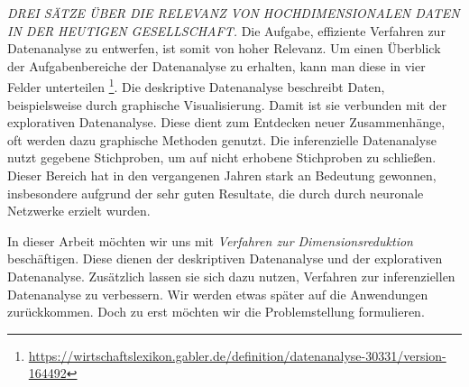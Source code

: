 

	\textit{DREI SÄTZE ÜBER DIE RELEVANZ VON HOCHDIMENSIONALEN DATEN IN DER HEUTIGEN GESELLSCHAFT.} %
	Die Aufgabe, effiziente Verfahren zur Datenanalyse zu entwerfen, ist somit von hoher Relevanz. 
	Um einen Überblick der Aufgabenbereiche der Datenanalyse zu erhalten, kann man diese in vier Felder 
	unterteilen \footnote{\url{https://wirtschaftslexikon.gabler.de/definition/datenanalyse-30331/version-164492}}.
	Die deskriptive Datenanalyse beschreibt Daten, beispielsweise durch graphische Visualisierung. 
	Damit ist sie verbunden mit der explorativen Datenanalyse. Diese 
	dient zum Entdecken neuer Zusammenhänge, oft werden dazu graphische Methoden genutzt. 
	Die inferenzielle Datenanalyse nutzt gegebene Stichproben, um auf nicht erhobene Stichproben 
	zu schließen. Dieser Bereich hat in den vergangenen Jahren stark an Bedeutung gewonnen, 
	insbesondere aufgrund der sehr guten Resultate, die durch durch neuronale Netzwerke erzielt wurden. 

	In dieser Arbeit möchten wir uns mit \textit{Verfahren zur Dimensionsreduktion} beschäftigen. 
	Diese dienen der deskriptiven Datenanalyse und der explorativen Datenanalyse. Zusätzlich 
	lassen sie sich dazu nutzen, Verfahren zur inferenziellen Datenanalyse zu verbessern. 
	Wir werden etwas später auf die Anwendungen zurückkommen. Doch zu erst möchten wir 
	die Problemstellung formulieren. 

